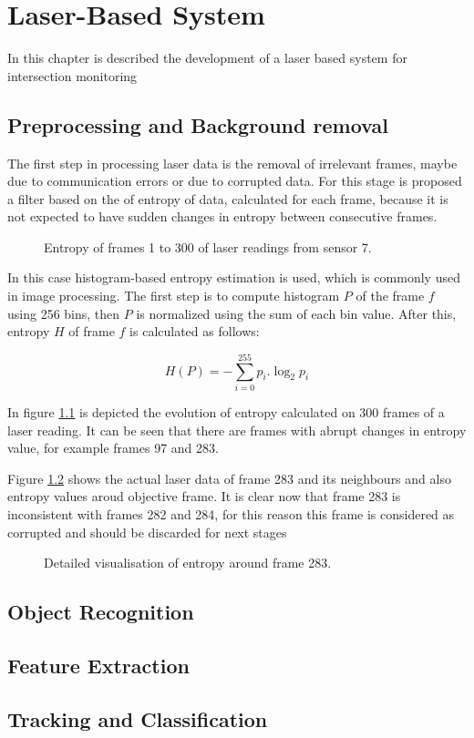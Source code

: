 
\chapter{Laser-Based System}

In this chapter is described the development of a laser based system for intersection monitoring

\section{Preprocessing and Background removal}

The first step in processing laser data is the removal of irrelevant frames, maybe due to communication errors or due to corrupted data. For this stage is proposed a filter based on the of entropy of data, calculated for each frame, because it is not expected to have sudden changes in entropy between consecutive frames. 

\begin{figure}[ht!]
\centering

\caption{Entropy of frames 1 to 300 of laser readings from sensor 7.}
\label{entropy_frames}
\end{figure}

In this case histogram-based entropy estimation is used, which is commonly used in image processing. The first step is to compute histogram $P$ of the frame $f$ using 256 bins, then $P$ is normalized using the sum of each bin value. After this, entropy $H$ of frame $f$ is calculated as follows:

\begin{equation}
 H(P)=-\sum_{i=0}^{255}{ p_i.\log_{2}{p_i}} 
\end{equation}

In figure \ref{entropy_frames} is depicted the evolution of entropy calculated on 300 frames of a laser reading. It can be seen that there are frames with abrupt changes in entropy value, for example frames 97 and 283.


Figure \ref{l7-f283} shows the actual laser data of frame 283 and its neighbours and also entropy values aroud objective frame. It is clear now that frame 283 is inconsistent with frames 282 and 284, for this reason this frame is considered as corrupted and should be discarded for next stages

\begin{figure}[ht!]
\centering

\caption{Detailed visualisation of entropy around frame 283.}
\label{l7-f283}
\end{figure}



\section{Object Recognition}
\section{Feature Extraction}
\section{Tracking and Classification}
